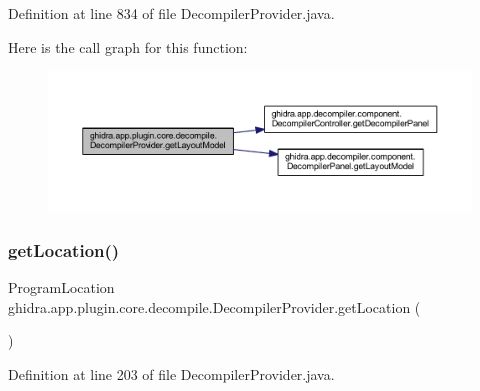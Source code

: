 Definition at line 834 of file Decompiler\+Provider.\+java.

Here is the call graph for this function\+:
\nopagebreak
\begin{figure}[H]
\begin{center}
\leavevmode
\includegraphics[width=350pt]{classghidra_1_1app_1_1plugin_1_1core_1_1decompile_1_1_decompiler_provider_a128dd05b94cfa8445f1fe80bc1410ee8_cgraph}
\end{center}
\end{figure}
\mbox{\label{classghidra_1_1app_1_1plugin_1_1core_1_1decompile_1_1_decompiler_provider_a38fd2ce84b83587100a537a0349fc77f}} 
\subsubsection{\texorpdfstring{getLocation()}{getLocation()}}
{\footnotesize\ttfamily Program\+Location ghidra.\+app.\+plugin.\+core.\+decompile.\+Decompiler\+Provider.\+get\+Location (\begin{DoxyParamCaption}{ }\end{DoxyParamCaption})\hspace{0.3cm}{\ttfamily [inline]}}



Definition at line 203 of file Decompiler\+Provider.\+java.

